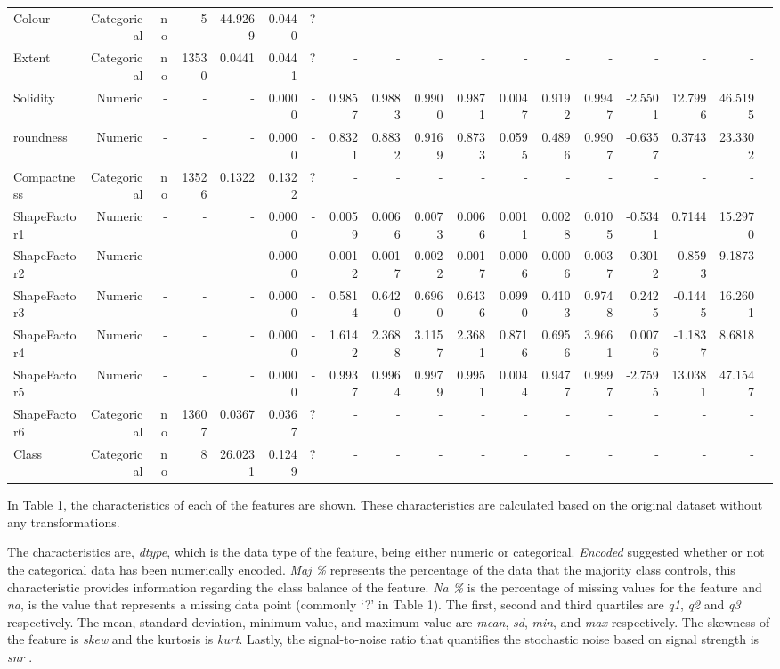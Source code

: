 \documentclass[conference]{IEEEtran}
\begin{document}
\begin{table}[htbp]
{\begin{tabular}{lrrrrrrrrrrrrrrrrr}
Colour & Categorical & no & 5 & 44.9269 & 0.0440 & ? & - & - & - & - & - & - & - & - & - & - \\
Extent & Categorical & no & 13530 & 0.0441 & 0.0441 & ? & - & - & - & - & - & - & - & - & - & - \\
Solidity & Numeric & - & - & - & 0.0000 & - & 0.9857 & 0.9883 & 0.9900 & 0.9871 & 0.0047 & 0.9192 & 0.9947 & -2.5501 & 12.7996 & 46.5195 \\
roundness & Numeric & - & - & - & 0.0000 & - & 0.8321 & 0.8832 & 0.9169 & 0.8733 & 0.0595 & 0.4896 & 0.9907 & -0.6357 & 0.3743 & 23.3302 \\
Compactness & Categorical & no & 13526 & 0.1322 & 0.1322 & ? & - & - & - & - & - & - & - & - & - & - \\
ShapeFactor1 & Numeric & - & - & - & 0.0000 & - & 0.0059 & 0.0066 & 0.0073 & 0.0066 & 0.0011 & 0.0028 & 0.0105 & -0.5341 & 0.7144 & 15.2970 \\
ShapeFactor2 & Numeric & - & - & - & 0.0000 & - & 0.0012 & 0.0017 & 0.0022 & 0.0017 & 0.0006 & 0.0006 & 0.0037 & 0.3012 & -0.8593 & 9.1873 \\
ShapeFactor3 & Numeric & - & - & - & 0.0000 & - & 0.5814 & 0.6420 & 0.6960 & 0.6436 & 0.0990 & 0.4103 & 0.9748 & 0.2425 & -0.1445 & 16.2601 \\
ShapeFactor4 & Numeric & - & - & - & 0.0000 & - & 1.6142 & 2.3688 & 3.1157 & 2.3681 & 0.8716 & 0.6956 & 3.9661 & 0.0076 & -1.1837 & 8.6818 \\
ShapeFactor5 & Numeric & - & - & - & 0.0000 & - & 0.9937 & 0.9964 & 0.9979 & 0.9951 & 0.0044 & 0.9477 & 0.9997 & -2.7595 & 13.0381 & 47.1547 \\
ShapeFactor6 & Categorical & no & 13607 & 0.0367 & 0.0367 & ? & - & - & - & - & - & - & - & - & - & - \\
Class & Categorical & no & 8 & 26.0231 & 0.1249 & ? & - & - & - & - & - & - & - & - & - & - \\
\bottomrule
\end{tabular}
}
\end{table}

In Table 1, the characteristics of each of the features are shown. These characteristics are calculated based on the original dataset
without any transformations.

The characteristics are, \emph{dtype}, which is the data type of the feature, being either numeric or categorical. \emph{Encoded} suggested
whether or not the categorical data has been numerically encoded. \emph{Maj \%} represents the percentage of the data that the majority class controls,
this characteristic provides information regarding the class balance of the feature. \emph{Na \%} is the percentage of missing values for the feature and \emph{na}, is
the value that represents a missing data point (commonly `?' in Table 1). The first, second and third quartiles are \emph{q1}, \emph{q2} and \emph{q3} respectively. 
The mean, standard deviation, minimum value, and maximum value are \emph{mean}, \emph{sd}, \emph{min}, and \emph{max} respectively. The skewness of
the feature is \emph{skew} and the kurtosis is \emph{kurt}. Lastly, the signal-to-noise ratio that quantifies the stochastic noise based on signal strength is \emph{snr} \cite{snr}. 
\end{document}
